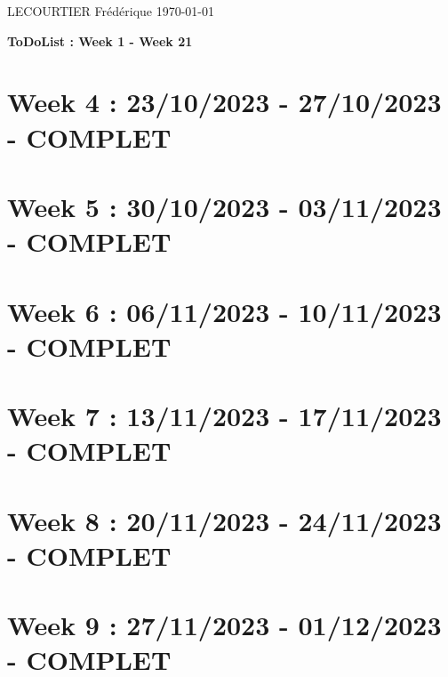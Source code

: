 \documentclass{article}
\begin{document}
	LECOURTIER Frédérique \hfill \today
	\begin{center}
		\Large\textbf{{ToDoList : Week 1 - Week 21}}
	\end{center}
	\tableofcontents

	\newpage

	\section*{Week 4 : 23/10/2023 - 27/10/2023 - COMPLET}
	

	\newpage

	\section*{Week 5 : 30/10/2023 - 03/11/2023 - COMPLET}
	

	\newpage

	\section*{Week 6 : 06/11/2023 - 10/11/2023 - COMPLET}
	

	\newpage

	\section*{Week 7 : 13/11/2023 - 17/11/2023 - COMPLET}
	

	\newpage

	\section*{Week 8 : 20/11/2023 - 24/11/2023 - COMPLET}
	

	\newpage

	\section*{Week 9 : 27/11/2023 - 01/12/2023 - COMPLET}
	
\end{document}
